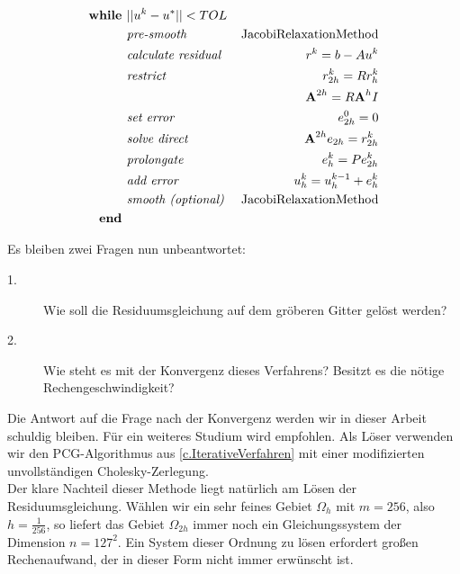 \begin{eqnarray}
\textbf{while }                                 &||u^{k} - u^{*}|| < TOL \notag \\
&\textit{pre-smooth }                         &\textnormal{JacobiRelaxationMethod} \notag \\
&\textit{calculate residual }        &r^{k} = b - Au^{k} \notag \\
&\textit{restrict }                         &r^{k}_{2h}=Rr^{k}_{h} \notag \\
&                                                                &{\textbf{A}}^{2h} = R{\textbf{A}}^{h}I \notag \\
&\textit{set error }                        &e^{0}_{2h} = 0 \notag \\
&\textit{solve direct }                        &{\textbf{A}}^{2h} e_{2h} = r^{k}_{2h} \notag \\
&\textit{prolongate }                        &e^{k}_{h} = Pe^{k}_{2h} \notag \\
&\textit{add error }                        &u^{k}_{h} = u^{k-1}_{h} + e^{k}_{h} \notag \\
&\textit{smooth (optional) }        &\textnormal{JacobiRelaxationMethod} \notag \\
\textbf{end } \notag
\end{eqnarray}

Es bleiben zwei Fragen nun unbeantwortet:
\begin{description}
\item[1.] Wie soll die Residuumsgleichung auf dem gröberen Gitter gelöst werden?
\item[2.] Wie steht es mit der Konvergenz dieses Verfahrens? Besitzt es die nötige Rechengeschwindigkeit?
\end{description}

Die Antwort auf die Frage nach der Konvergenz werden wir in dieser Arbeit schuldig bleiben. Für ein weiteres Studium wird \cite{SAAD8} empfohlen.
Als Löser verwenden wir den PCG-Algorithmus aus \autoref{c.IterativeVerfahren} mit einer modifizierten unvollständigen Cholesky-Zerlegung.\\

Der klare Nachteil dieser Methode liegt natürlich am Lösen der Residuumsgleichung. Wählen wir ein sehr feines Gebiet $\Omega_{h}$ mit $m = 256$, also $h = \frac {1} {256}$, so liefert das Gebiet $\Omega_{2h}$ immer noch ein Gleichungssystem der Dimension $n = 127^{2}$. Ein System dieser Ordnung zu lösen erfordert großen Rechenaufwand, der in dieser Form nicht immer erwünscht ist. \\

